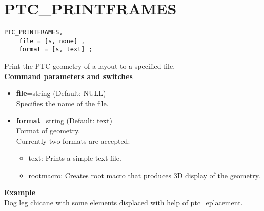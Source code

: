 
\section{PTC\_PRINTFRAMES}

\begin{verbatim}
PTC_PRINTFRAMES, 
    file = [s, none] ,
    format = [s, text] ; 
\end{verbatim}

Print the PTC geometry of a layout to a specified file.   \\

{\bf Command parameters and switches}
\begin{itemize}
   \item {\bf file}=string (Default: NULL)\\
     Specifies the name of the file.   
   \item {\bf format}=string (Default: text)\\
     Format of geometry.\\
     Currently two formats are accepted:       
     \begin{itemize}
	\item text: Prints a simple text file.           
	\item rootmacro: Creates \href{http://root.cern.ch}{root} macro
          that produces 3D display of the geometry.            
     \end{itemize}
\end{itemize}


{\bf Example }\\
\href{http://cern.ch/frs/mad-X_examples/ptc_madx_interface/eplacement/eplacement.madx}{Dog
  leg chicane} with some elements displaced with help of
ptc\_eplacement.

 
% 
